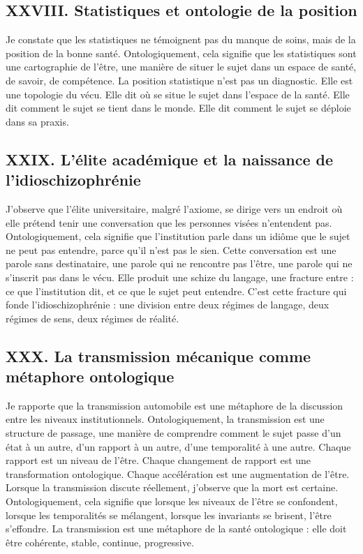 \documentclass[12pt,a4paper]{article}
\begin{document}
\subsection*{XXVIII. Statistiques et ontologie de la position}
Je constate que les statistiques ne témoignent pas du manque de soins, mais de la position de la bonne santé. Ontologiquement, cela signifie que les statistiques sont une cartographie de l’être, une manière de situer le sujet dans un espace de santé, de savoir, de compétence.
La position statistique n’est pas un diagnostic. Elle est une topologie du vécu.
Elle dit où se situe le sujet dans l’espace de la santé. Elle dit comment le sujet se tient dans le monde. Elle dit comment le sujet se déploie dans sa praxis.

\subsection*{XXIX. L’élite académique et la naissance de l’idioschizophrénie}
J’observe que l’élite universitaire, malgré l’axiome, se dirige vers un endroit où elle prétend tenir une conversation que les personnes visées n’entendent pas. Ontologiquement, cela signifie que l’institution parle dans un idiôme que le sujet ne peut pas entendre, parce qu’il n’est pas le sien.
Cette conversation est une parole sans destinataire, une parole qui ne rencontre pas l’être, une parole qui ne s’inscrit pas dans le vécu.
Elle produit une schize du langage, une fracture entre :
	ce que l’institution dit,
	et ce que le sujet peut entendre.
C’est cette fracture qui fonde l’idioschizophrénie : une division entre deux régimes de langage, deux régimes de sens, deux régimes de réalité.

\subsection*{XXX. La transmission mécanique comme métaphore ontologique}
Je rapporte que la transmission automobile est une métaphore de la discussion entre les niveaux institutionnels. Ontologiquement, la transmission est une structure de passage, une manière de comprendre comment le sujet passe d’un état à un autre, d’un rapport à un autre, d’une temporalité à une autre.
Chaque rapport est un niveau de l’être. Chaque changement de rapport est une transformation ontologique. Chaque accélération est une augmentation de l’être.
Lorsque la transmission discute réellement, j’observe que la mort est certaine. Ontologiquement, cela signifie que lorsque les niveaux de l’être se confondent, lorsque les temporalités se mélangent, lorsque les invariants se brisent, l’être s’effondre.
La transmission est une métaphore de la santé ontologique : elle doit être cohérente, stable, continue, progressive.
\end{document}
